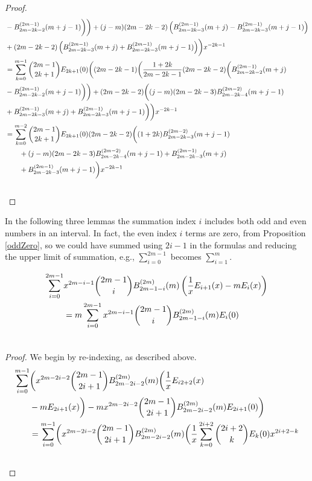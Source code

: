 \documentclass[fleqn,a4paper,9pt]{article}
\begin{document}
\begin{flushleft}
\begin{proof}
\begin{align}
&-B_{2m-2k-2}^{(2m-1)}(m+j-1)\biggr)\biggr)+(j-m)(2m-2k-2)\left(B_{2m-2k-3}^{(2m-1)}(m+j)-B_{2m-2k-3}^{(2m-1)}(m+j-1)\right)\\\notag
&+(2m-2k-2)\left(B_{2m-2k-3}^{(2m-1)}(m+j)+B_{2m-2k-3}^{(2m-1)}(m+j-1)\right)\biggr)x^{-2k-1}\\\notag
&=\sum_{k=0}^{m-1}\binom{2m-1}{2k+1}E_{2k+1}(0)\biggl((2m-2k-1)\biggl(\frac{1+2k}{2m-2k-1}(2m-2k-2)\biggl(B_{2m-2k-2}^{(2m-1)}(m+j)\\\notag
&-B_{2m-2k-2}^{(2m-1)}(m+j-1)\biggr)\biggr)+(2m-2k-2)\biggl((j-m)(2m-2k-3)B_{2m-2k-4}^{(2m-2)}(m+j-1)\\\notag
&+B_{2m-2k-3}^{(2m-1)}(m+j)+B_{2m-2k-3}^{(2m-1)}(m+j-1)\biggr)\biggr)x^{-2k-1}\\\notag
&=\sum_{k=0}^{m-2}\binom{2m-1}{2k+1}E_{2k+1}(0)(2m-2k-2)\biggl((1+2k)B_{2m-2k-3}^{(2m-2)}(m+j-1)\\\notag
&\  \  \  \  \  \  +(j-m)(2m-2k-3)B_{2m-2k-4}^{(2m-2)}(m+j-1)+B_{2m-2k-3}^{(2m-1)}(m+j)\\\notag
&\  \  \  \  \  \  +B_{2m-2k-3}^{(2m-1)}(m+j-1)\biggr) x^{-2k-1}\\\notag
\end{align}
\end{proof}
In the following three lemmas the summation index $i$ includes both odd and even numbers in an interval. In fact, the even index $i$ terms are zero, from Proposition \ref{oddZero}, so we could have summed  using $2i-1$ in the formulas and reducing the upper limit of summation, e.g., $\sum_{i=0}^{2m-1}$ becomes $\sum_{i=1}^{m}$.
\begin{lemma}\label{firstterm}
\begin{align}
\sum_{i=0}^{2m-1}&x^{2m-i-1}\binom{2m-1}{i}B_{2m-1-i}^{(2m)}(m)\left(\frac{1}{x}E_{i+1}(x)-m E_i(x)\right)\\\notag
&=m\sum_{i=0}^{2m-1}x^{2m-i-1}\binom{2m-1}{i}B_{2m-1-i}^{(2m)}(m) E_i(0)\\\notag
\end{align}
\end{lemma}
\begin{proof}
We begin by re-indexing, as described above.
\begin{align}
\sum_{i=0}^{m-1}&\biggl(x^{2m-2i-2}\binom{2m-1}{2i+1}B_{2m-2i-2}^{(2m)}(m)\biggl(\frac{1}{x}E_{i2+2}(x)\\\notag
&-m E_{2i+1}(x)\biggr)-m x^{2m-2i-2}\binom{2m-1}{2i+1}B_{2m-2i-2}^{(2m)}(m)E_{2i+1}(0)\biggr)\\\notag
&=\sum_{i=0}^{m-1}\biggl(x^{2m-2i-2}\binom{2m-1}{2i+1}B_{2m-2i-2}^{(2m)}(m)\biggl(\frac{1}{x}\sum_{k=0}^{2i+2}\binom{2i+2}{k}E_k(0)x^{2i+2-k}\\\notag

\end{align}
\end{proof}
\end{flushleft}
\end{document}
